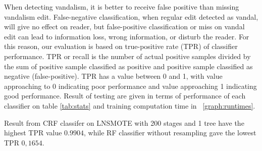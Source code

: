 When detecting vandalism, it is better to receive false positive than missing
vandalism edit.
False-negative classification, when regular edit detected as vandal, will
give no effect on reader, but false-positive classification or miss on vandal
edit can lead to information loss, wrong information, or disturb the reader.
For this reason, our evaluation is based on true-positive rate (TPR) of
classifier performance.
TPR or recall is the number of actual positive samples
divided by the sum of positive sample classified as positive and positive
sample classified as negative (false-positive).
TPR has a value between 0 and 1, with value approaching to 0 indicating poor
performance and value approaching 1 indicating good performance.
Result of testing are given in terms of performance of each classifier on table
\ref{tab:stats} and training computation time in
\figurename~\ref{graph:runtimes}.

Result from CRF classifer on LNSMOTE with 200 stages and 1 tree have the
highest TPR value $0.9904$, while
RF classifier without resampling gave the lowest TPR $0,1654$.

	

	
